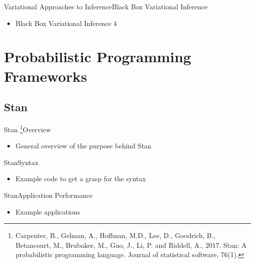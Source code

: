 \documentclass[AERbeamer%
              ,optEnglish%
              ,optBiber%
              ,optBibstyleAlphabetic%
              ,optBeamerClassicFormat%
              ]{AERlatex}%
\begin{document}
\begin{frame}[c]{Variational Approaches to Inference}{Black Box Variational Inference}
    \centering
    \begin{itemize}
        \item Black Box Variational Inference 4
    \end{itemize}
\end{frame}




\section{Probabilistic Programming Frameworks}


\subsection{Stan}
\begin{frame}[c]{Stan \footnote{Carpenter, B., Gelman, A., Hoffman, M.D., Lee, D.,
                                Goodrich, B., Betancourt, M., Brubaker, M., Guo, J., Li, P.
                                and Riddell, A., 2017. Stan: A probabilistic programming
                                language. Journal of statistical software, 76(1).}}{Overview}
    \centering
    \begin{itemize}
        \item General overview of the purpose behind Stan
    \end{itemize}
\end{frame}


\begin{frame}[c]{Stan}{Syntax}
    \centering
    \begin{itemize}
        \item Example code to get a grasp for the syntax
    \end{itemize}
\end{frame}


\begin{frame}[c]{Stan}{Application Performance}
    \centering
    \begin{itemize}
        \item Example applications
    \end{itemize}
\end{frame}
\end{document}
